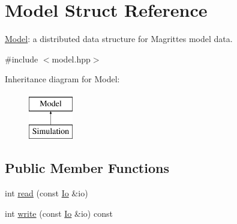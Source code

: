 \hypertarget{structModel}{}\section{Model Struct Reference}
\label{structModel}


\mbox{\hyperlink{structModel}{Model}}\+: a distributed data structure for Magritte\textquotesingle{}s model data.  




{\ttfamily \#include $<$model.\+hpp$>$}

Inheritance diagram for Model\+:\begin{figure}[H]
\begin{center}
\leavevmode
\includegraphics[height=2.000000cm]{structModel}
\end{center}
\end{figure}
\subsection*{Public Member Functions}
\begin{DoxyCompactItemize}
\item 
int \mbox{\hyperlink{structModel_a890018e455118fa3e77def90f280dc52}{read}} (const \mbox{\hyperlink{structIo}{Io}} \&io)
\item 
int \mbox{\hyperlink{structModel_a2d851441d0343b15e8e5affd2f786678}{write}} (const \mbox{\hyperlink{structIo}{Io}} \&io) const
\end{DoxyCompactItemize}
